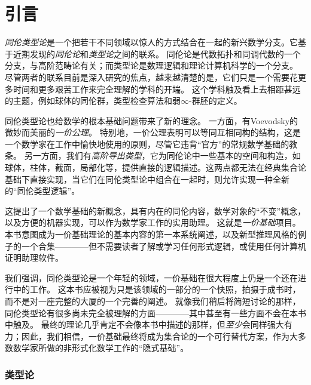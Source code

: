 \chapter*{引言}
\setcounter{page}{1}


\emph{同伦类型论}是一个把若干不同领域以惊人的方式结合在一起的新兴数学分支。它基于近期发现的\emph{同伦论}和\emph{类型论}之间的联系。
同伦论是代数拓扑和同调代数的一个分支，与高阶范畴论有关；而类型论是数理逻辑和理论计算机科学的一个分支。
尽管两者的联系目前是深入研究的焦点，越来越清楚的是，它们只是一个需要花更多时间和更多艰苦工作来完全理解的学科的开端。
这个学科触及看上去相距甚远的主题，例如球体的同伦群，类型检查算法和弱$\infty$-群胚的定义。

同伦类型论也给数学的根本基础问题带来了新的理念。
%
一方面，有Voevodsky的微妙而美丽的\emph{一价公理}。 
%
特别地，一价公理表明可以等同互相同构的结构，这是一个数学家在工作中愉快地使用的原则，尽管它违背“官方”的常规数学基础的教条。
另一方面，我们有\emph{高阶导出类型}，它为同伦论中一些基本的空间和构造，如球体，柱体，截面，局部化等，提供直接的逻辑描述。这两点都无法在经典集合论基础下直接实现，当它们在同伦类型论中组合在一起时，则允许实现一种全新的“同伦类型逻辑”。
%

这提出了一个数学基础的新概念，具有内在的同伦内容，数学对象的“不变”概念，以及方便的机器实现，可以作为数学家工作的实用助理。
这就是\emph{一价基础}项目。本书意图成为一价基础理论的基本内容的第一本系统阐述，以及新型推理风格的例子的一个合集————但不需要读者了解或学习任何形式逻辑，或使用任何计算机证明助理软件。

\OPTwidow

我们强调，同伦类型论是一个年轻的领域，一价基础在很大程度上仍是一个还在进行中的工作。
这本书应被视为只是该领域的一部分的一个快照，拍摄于成书时，而不是对一座完整的大厦的一个完善的阐述。
就像我们稍后将简短讨论的那样，同伦类型论有很多尚未完全被理解的方面————其中甚至有一些方面不会在本书中触及。
最终的理论几乎肯定不会像本书中描述的那样，但\emph{至少}会同样强大有力；因此，我们相信，一价基础最终将成为集合论的一个可行替代方案，作为大多数数学家所做的非形式化数学工作的“隐式基础”。

\subsection*{类型论}

